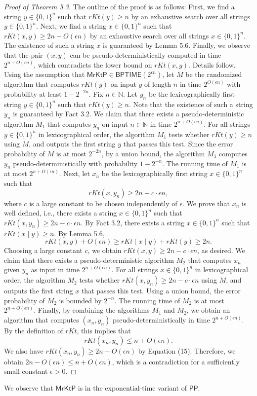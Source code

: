 \begin{proof}[Proof of Theorem 5.3]
The outline of the proof is as follows: First, we find a string $y\in\{0,1\}^n$ such that $rKt(y)\geq n$ by an exhaustive search over all strings $y\in\{0,1\}^n$. Next, we find a string $x\in\{0,1\}^n$ such that $rKt(x,y)\geq2n-O(\epsilon n)$ by an exhaustive search over all strings $x\in\{0,1\}^n$. The existence of such a string $x$ is guaranteed by Lemma 5.6. Finally, we observe that the pair $(x,y)$ can be pseudo-deterministically computed in time $2^{n+O(\epsilon n)}$, which contradicts the lower bound on $rKt(x,y)$. Details follow.
Using the assumption that $\mathsf{MrKtP}\in\mathsf{BPTIME}(2^{\epsilon n})$, let $M$ be the randomized algorithm that computes $rKt(y)$ on input $y$ of length $n$ in time $2^{O(\epsilon n)}$ with probability at least $1-2^{-2n}$. Fix $n\in\mathbb N$. Let $y_n$ be the lexicographically first string $y\in\{0,1\}^n$ such that $rKt(y)\geq n$. Note that the existence of such a string $y_n$ is guaranteed by Fact 3.2.
We claim that there exists a pseudo-deterministic algorithm $M_1$ that computes $y_n$ on input $n\in\mathbb N$ in time $2^{n+O(\epsilon n)}$. For all strings $y\in\{0,1\}^n$ in lexicographical order, the algorithm $M_1$ tests whether $rKt(y)\geq n$ using $M$, and outputs the first string $y$ that passes this test. Since the error probability of $M$ is at most $2^{-2n}$, by a union bound, the algorithm $M_1$ computes $y_n$ pseudo-deterministically with probability $1-2^{-n}$. The running time of $M_1$ is at most $2^{n+O(\epsilon n)}$.
Next, let $x_n$ be the lexicographically first string $x\in\{0,1\}^n$ such that
\[rKt(x,y_n)\geq2n-c\cdot\epsilon n,\tag{15}\]
where $c$ is a large constant to be chosen independently of $\epsilon$. We prove that $x_n$ is well defined, i.e., there exists a string $x\in\{0,1\}^n$ such that $rKt(x,y_n)\geq2n-c\cdot\epsilon n$. By Fact 3.2, there exists a string $x\in\{0,1\}^n$ such that $rKt(x\mid y)\geq n$. By Lemma 5.6,
\[rKt(x,y)+O(\epsilon n)\geq rKt(x\mid y)+rKt(y)\geq2n.\]
Choosing a large constant $c$, we obtain $rKt(x,y)\geq2n-c\cdot\epsilon n$, as desired.
We claim that there exists a pseudo-deterministic algorithm $M_2$ that computes $x_n$ given $y_n$ as input in time $2^{n+O(\epsilon n)}$. For all strings $x\in\{0,1\}^n$ in lexicographical order, the algorithm $M_2$ tests whether $rKt(x,y_n)\geq2n-c\cdot\epsilon n$ using $M$, and outputs the first string $x$ that passes this test. Using a union bound, the error probability of $M_2$ is bounded by $2^{-n}$. The running time of $M_2$ is at most $2^{n+O(\epsilon n)}$.
Finally, by combining the algorithms $M_1$ and $M_2$, we obtain an algorithm that computes $(x_n,y_n)$ pseudo-deterministically in time $2^{n+O(\epsilon n)}$. By the definition of $rKt$, this implies that
\[rKt(x_n,y_n)\leq n+O(\epsilon n).\]
We also have $rKt(x_n,y_n)\geq2n-O(\epsilon n)$ by Equation (15). Therefore, we obtain $2n-O(\epsilon n)\leq n+O(\epsilon n)$, which is a contradiction for a sufficiently small constant $\epsilon>0$.
\end{proof}
We observe that $\mathsf{MrKtP}$ is in the exponential-time variant of $\mathsf{PP}$.
